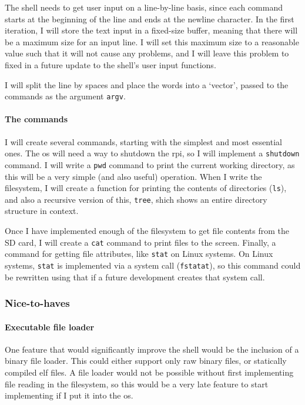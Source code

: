 \documentclass{article}
\begin{document}
The shell needs to get user input on a line-by-line basis, since each command
starts at the beginning of the line and ends at the newline character. In the
first iteration, I will store the text input in a fixed-size buffer, meaning
that there will be a maximum size for an input line. I will set this maximum
size to a reasonable value such that it will not cause any problems, and I will
leave this problem to fixed in a future update to the shell's user input
functions.

I will split the line by spaces and place the words into a `vector',
passed to the commands as the argument \texttt{argv}.

\paragraph{The commands}
I will create several commands, starting with the simplest and most essential
ones. The \gls{os} will need a way to shutdown the \gls{rpi}, so I will
implement a \texttt{shutdown} command. I will write a \texttt{pwd} command to
print the current working directory, as this will be a very simple (and also
useful) operation. When I write the filesystem, I will create a function for
printing the contents of directories (\texttt{ls}), and also a recursive
version of this, \texttt{tree}, shich shows an entire directory structure in
context.

Once I have implemented enough of the filesystem to get file contents from the
SD card, I will create a \texttt{cat} command to print files to the screen.
Finally, a command for getting file attributes, like \texttt{stat} on Linux
systems. On Linux systems, \texttt{stat} is implemented via a system call
(\texttt{fstatat}), so this command could be rewritten using that if a future
development creates that system call.

\subsubsection{Nice-to-haves}
\paragraph{Executable file loader}
One feature that would significantly improve the shell would be the inclusion
of a binary file loader. This could either support only raw binary files, or
statically compiled \gls{elf} files. A file loader would not be possible
without first implementing file reading in the filesystem, so this would be a
very late feature to start implementing if I put it into the \gls{os}.
\end{document}
